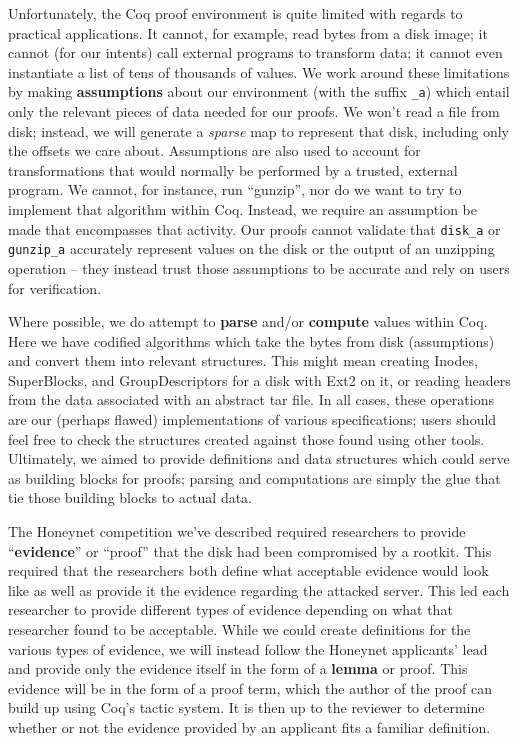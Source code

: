 \documentclass[nocopyrightspace]{sigplanconf}
\begin{document}
Unfortunately, the Coq proof environment is quite limited with regards to
practical applications. It cannot, for example, read bytes from a disk image;
it cannot (for our intents) call external programs to transform data; it
cannot even instantiate a list of tens of thousands of values. We work around
these limitations by making {\bf assumptions} about our environment (with the
suffix {\tt \_a}) which entail only the relevant pieces of data needed for our
proofs. We won't read a file from disk; instead, we will generate a {\it
sparse} map to represent that disk, including only the offsets we care about.
Assumptions are also used to account for transformations that would normally
be performed by a trusted, external program. We cannot, for instance, run
``gunzip'', nor do we want to try to implement that algorithm within Coq.
Instead, we require an assumption be made that encompasses that activity. Our
proofs cannot validate that {\tt disk\_a} or {\tt gunzip\_a} accurately
represent values on the disk or the output of an unzipping operation -- they
instead trust those assumptions to be accurate and rely on users for
verification.

Where possible, we do attempt to {\bf parse} and/or {\bf compute} values
within Coq. Here we have codified algorithms which take the bytes from disk
(assumptions) and convert them into relevant structures. This might mean
creating Inodes, SuperBlocks, and GroupDescriptors for a disk with Ext2 on it,
or reading headers from the data associated with an abstract tar file. In all
cases, these operations are our (perhaps flawed) implementations of various
specifications; users should feel free to check the structures created against
those found using other tools. Ultimately, we aimed to provide definitions and
data structures which could serve as building blocks for proofs; parsing and
computations are simply the glue that tie those building blocks to actual
data.

The Honeynet competition we've described required researchers to provide
``{\bf evidence}'' or ``proof'' that the disk had been compromised by a
rootkit. This required that the researchers both define what acceptable
evidence would look like as well as provide it the evidence regarding the
attacked server. This led each researcher to provide different types of
evidence depending on what that researcher found to be acceptable. While we
could create definitions for the various types of evidence, we will instead
follow the Honeynet applicants' lead and provide only the evidence itself in
the form of a {\bf lemma} or proof. This evidence will be in the form of a
proof term, which the author of the proof can build up using Coq's tactic
system. It is then up to the reviewer to determine whether or not the evidence
provided by an applicant fits a familiar definition.
\end{document}
